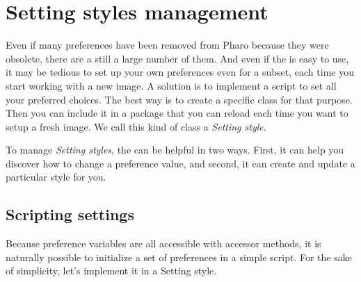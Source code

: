 \documentclass[a4paper,10pt,twoside]{book}
\begin{document}
{%
%
%
%
%

\section{Setting styles management}
\label{sec:SettingStylesManagement}
Even if many preferences have been removed from Pharo because they were obsolete, there are a still a large number of them. And even if the \setbrowser is easy to use, it may be tedious to set up your own preferences even for a subset, each time you start working with a new image. A solution is to implement a script to set all your preferred choices. The best way is to create a specific class for that purpose. Then you can include it in a package that you can reload each time you want to setup a fresh image. We call this kind of class a \textit{Setting style}. 

To manage \textit{Setting styles}, the \setbrowser can be helpful in two ways. First, it can help you discover how to change a preference value, and second, it can create and update a particular style for you.

\subsection{Scripting settings}
Because preference variables are all accessible with accessor methods, it is naturally possible to initialize a set of preferences in a simple script. For the sake of simplicity, let's implement it in a Setting style.

}
\end{document}
